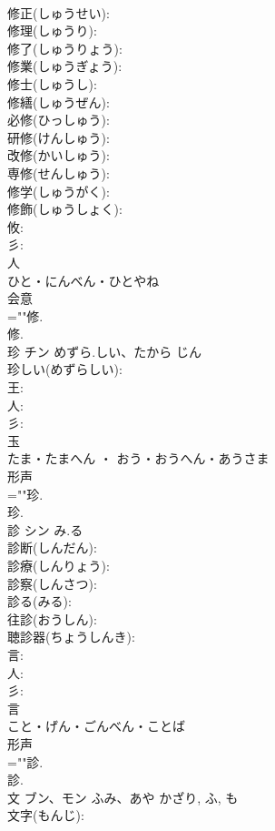 \documentclass[8pt]{extreport}
\begin{document}
\begin{CJK}{UTF8}{min}
\\	修正(しゅうせい): 
\\	修理(しゅうり): 
\\	修了(しゅうりょう): 
\\	修業(しゅうぎょう): 
\\	修士(しゅうし): 
\\	修繕(しゅうぜん): 
\\	必修(ひっしゅう): 
\\	研修(けんしゅう): 
\\	改修(かいしゅう): 
\\	専修(せんしゅう): 
\\	修学(しゅうがく): 
\\	修飾(しゅうしょく): 
\\	攸: 
\\	彡: 
\\	人	
\\	ひと・にんべん・ひとやね	
\\	会意 
\\	=""修.
\\	修.
\\	珍	チン	めずら.しい、たから	じん	
\\	珍しい(めずらしい): 
\\	王: 
\\	人: 
\\	彡: 
\\	玉	
\\	たま・たまへん ・ おう・おうへん・あうさま	
\\	形声 
\\	=""珍.
\\	珍.
\\	診	シン	み.る		
\\	診断(しんだん): 
\\	診療(しんりょう): 
\\	診察(しんさつ): 
\\	診る(みる): 
\\	往診(おうしん): 
\\	聴診器(ちょうしんき): 
\\	言: 
\\	人: 
\\	彡: 
\\	言	
\\	こと・げん・ごんべん・ことば	
\\	形声 
\\	=""診.
\\	診.
\\	文	ブン、モン	ふみ、あや	かざり, ふ, も	
\\	文字(もんじ): 

\end{CJK}
\end{document}
